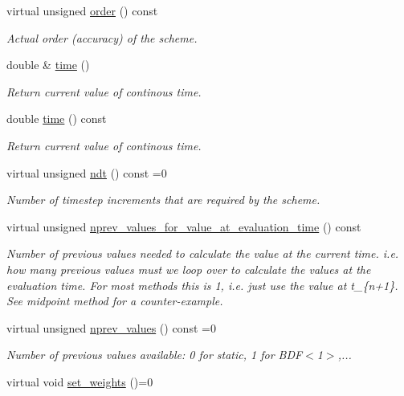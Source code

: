 \begin{DoxyCompactItemize}
virtual unsigned \hyperlink{classoomph_1_1TimeStepper_a251e5d4b37381e582b7cf4c554e2e724}{order} () const
\begin{DoxyCompactList}\small\item\em Actual order (accuracy) of the scheme. \end{DoxyCompactList}\item 
double \& \hyperlink{classoomph_1_1TimeStepper_ab902086340e6b33c5114db30c1f644c1}{time} ()
\begin{DoxyCompactList}\small\item\em Return current value of continous time. \end{DoxyCompactList}\item 
double \hyperlink{classoomph_1_1TimeStepper_ab0fe7c6da82843fbaf406a29f5aaa78b}{time} () const
\begin{DoxyCompactList}\small\item\em Return current value of continous time. \end{DoxyCompactList}\item 
virtual unsigned \hyperlink{classoomph_1_1TimeStepper_a00e57b6436cff4fc82af481b81a78a1a}{ndt} () const =0
\begin{DoxyCompactList}\small\item\em Number of timestep increments that are required by the scheme. \end{DoxyCompactList}\item 
virtual unsigned \hyperlink{classoomph_1_1TimeStepper_a5fcbef20161383c516ecdba4cf782106}{nprev\+\_\+values\+\_\+for\+\_\+value\+\_\+at\+\_\+evaluation\+\_\+time} () const
\begin{DoxyCompactList}\small\item\em Number of previous values needed to calculate the value at the current time. i.\+e. how many previous values must we loop over to calculate the values at the evaluation time. For most methods this is 1, i.\+e. just use the value at t\+\_\+\{n+1\}. See midpoint method for a counter-\/example. \end{DoxyCompactList}\item 
virtual unsigned \hyperlink{classoomph_1_1TimeStepper_a0f38713ed304c18d9f7b5cf8131664c1}{nprev\+\_\+values} () const =0
\begin{DoxyCompactList}\small\item\em Number of previous values available\+: 0 for static, 1 for B\+D\+F$<$1$>$,... \end{DoxyCompactList}\item 
virtual void \hyperlink{classoomph_1_1TimeStepper_a028fa3a8d3c6db6b0ddf580cb0468d55}{set\+\_\+weights} ()=0

\end{DoxyCompactItemize}
